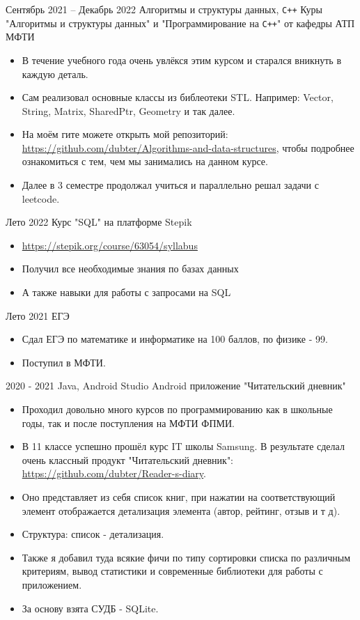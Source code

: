 \experience
{Сентябрь 2021 -- Декабрь 2022}
{Алгоритмы и структуры данных, \texttt{C++}}
{Куры "Алгоритмы и структуры данных" и "Программирование на \texttt{C++}" от кафедры АТП МФТИ}
{\begin{itemize}
    \item  В течение учебного года очень увлёкся этим курсом и старался вникнуть в каждую деталь.
    \item Сам реализовал основные классы из библеотеки STL. Например: Vector, String, Matrix, SharedPtr, Geometry и так далее.
    \item На моём гите можете открыть мой репозиторий: \href{https://github.com/dubter/Algorithms-and-data-structures}{ https://github.com/dubter/Algorithms-and-data-structures}, чтобы подробнее ознакомиться с тем, чем мы занимались на данном курсе.
    \item Далее в 3 семестре продолжал учиться и параллельно решал задачи с leetcode.

\end{itemize}}

\experience
{Лето 2022}
{}
{Курс "SQL" на платформе Stepik}
{\begin{itemize}
    \item \href{https://stepik.org/course/63054/syllabus
}{ https://stepik.org/course/63054/syllabus}
    \item Получил все необходимые знания по базах данных
    \item А также навыки для работы с запросами на SQL
\end{itemize}}

\experience
{Лето 2021}
{}
{ЕГЭ}
{\begin{itemize}
    \item Сдал ЕГЭ по математике и информатике на 100 баллов, по физике - 99.
    \item Поступил в МФТИ.
\end{itemize}}

\experience
{2020 - 2021}
{Java, Android Studio}
{Android приложение "Читательский дневник"}
{\begin{itemize}
    \item Проходил довольно много курсов по программированию как в школьные годы, так и после поступления на МФТИ ФПМИ.
    \item В 11 классе успешно прошёл курс IT школы Samsung. В результате сделал очень классный продукт "Читательский дневник": \href{https://github.com/dubter/Reader-s-diary}{https://github.com/dubter/Reader-s-diary}.
    \item Оно представляет из себя список книг, при нажатии на соответствующий элемент отображается детализация элемента (автор, рейтинг, отзыв и т д).
    \item Структура: список - детализация. 
    \item Также я добавил туда всякие фичи по типу сортировки списка по различным критериям, вывод статистики и современные библиотеки для работы с приложением.
    \item За основу взята СУДБ - SQLite. 
\end{itemize}}

